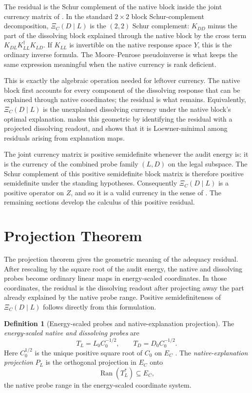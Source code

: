 \documentclass[11pt]{article}
\DeclareMathOperator{\Ran}{Ran}
\theoremstyle{definition}
\newtheorem{definition}[theorem]{Definition}
\begin{document}
The residual is the Schur complement of the native block inside the joint
currency matrix of .  In the standard
\(2\times2\) block Schur-complement decomposition,
\(\Xi_C(D\mid L)\) is the \((2,2)\) Schur complement: \(K_{DD}\) minus the part
of the dissolving block explained through the native block by the cross term
\(K_{DL}K_{LL}^\dagger K_{LD}\).  If \(K_{LL}\) is invertible on the native
response space \(Y\), this is the ordinary inverse formula.  The Moore--Penrose
pseudoinverse is what keeps the same expression meaningful when the native
currency is rank deficient.

This is exactly the algebraic operation needed for leftover currency.  The
native block first accounts for every component of the dissolving response that
can be explained through native coordinates; the residual is what remains.
Equivalently, \(\Xi_C(D\mid L)\) is the unexplained dissolving currency under
the native block's optimal explanation.   makes this
geometric by identifying the residual with a projected dissolving readout, and
 shows that it is Loewner-minimal among residuals
arising from explanation maps.

The joint currency matrix is positive semidefinite whenever the audit energy
is: it is the currency of the combined probe family \((L,D)\) on the legal
subspace.  The Schur complement of this positive semidefinite block matrix is
therefore positive semidefinite under the standing hypotheses.  Consequently
\(\Xi_C(D\mid L)\) is a positive operator on \(Z\), and so it is a valid
currency in the sense of .  The remaining sections develop
the calculus of this positive residual.
 \section{Projection Theorem}
\label{sec:projection}

The projection theorem gives the geometric meaning of the adequacy residual.
After rescaling by the square root of the audit energy, the native and
dissolving probes become ordinary linear maps in energy-scaled coordinates.  In
those coordinates, the residual is the dissolving readout after projecting away
the part already explained by the native probe range.  Positive
semidefiniteness of \(\Xi_C(D\mid L)\) follows directly from this formulation.

\begin{definition}[Energy-scaled probes and native-explanation projection]\label{def:xi:energy-scaled-probes}
The \emph{energy-scaled native and dissolving probes} are
\[
  T_L=L_0C_0^{-1/2},
  \qquad
  T_D=D_0C_0^{-1/2}.
\]
Here \(C_0^{1/2}\) is the unique positive square root of \(C_0\) on \(E_C\)
\citep{Higham2008Functions,Bhatia2007PositiveDefinite}.  The
\emph{native-explanation projection} \(P_L\) is the orthogonal projection in
\(E_C\) onto
\[
  \Ran(T_L^*)\subseteq E_C,
\]
the native probe range in the energy-scaled coordinate system.
\end{definition}
\end{document}
